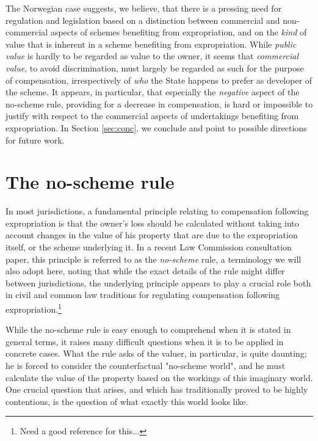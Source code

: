 The Norwegian case suggests, we believe, that there is a pressing need for regulation and legislation based on a distinction between commercial and non-commercial aspects of schemes benefiting from expropriation, and on the \emph{kind} of value that is inherent in a scheme benefiting from expropriation. While \emph{public value} is hardly to be regarded as value to the owner, it seems that \emph{commercial value}, to avoid discrimination, must largely be regarded as such for the purpose of compensation, irrespectively of \emph{who} the State happens to prefer as developer of the scheme. It appears, in particular, that especially the \emph{negative} aspect of the no-scheme rule, providing for a decrease in compensation, is hard or impossible to justify with respect to the commercial aspects of undertakings benefiting from expropriation. In Section \ref{sec:conc}, we conclude and point to possible directions for future work.

\section{The no-scheme rule}\label{sec:noscheme}

In most jurisdictions, a fundamental principle relating to compensation following expropriation is that the owner's loss should be calculated without taking into account changes in the value of his property that are due to the expropriation itself, or the scheme underlying it. In a recent Law Commission consultation paper, this principle is referred to as the \emph{no-scheme} rule, a terminology we will also adopt here, noting that while the exact details of the rule might differ between jurisdictions, the underlying principle appears to play a crucial role both in civil and common law traditions for regulating compensation following expropriation.\footnote{Need a good reference for this...}

While the no-scheme rule is easy enough to comprehend when it is stated in general terms, it raises many difficult questions when it is to be applied in concrete cases. What the rule asks of the valuer, in particular, is quite daunting; he is forced to consider the counterfactual "no-scheme world", and he must calculate the value of the property based on the workings of this imaginary world. One crucial question that arises, and which has traditionally proved to be highly contentious, is the question of what exactly this world looks like.

